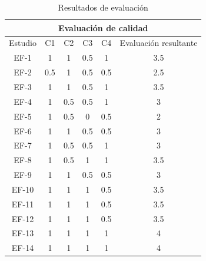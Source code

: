 \documentclass[conference,onecolumn,10pt]{IEEEtran}
\begin{document}
\begin{table}[!htbp]
        \caption{Resultados de evaluación}
        \label{tab:tablaresultados}
                \begin{center}
        \begin{tabular}{|c|c|c|c|c|c|l|}
                \hline
                \multicolumn{7}{|c|}{Evaluación de calidad}                                       \\ \hline
                Estudio  & C1   & C2   & C3   & C4   & \multicolumn{2}{c|}{Evaluación resultante} \\ \hline
                EF-1     & 1    & 1    & 0.5  & 1    & \multicolumn{2}{c|}{3.5}                   \\ \hline
                EF-2     & 0.5  & 1    & 0.5  & 0.5  & \multicolumn{2}{c|}{2.5}                   \\ \hline
                EF-3     & 1    & 1    & 0.5  & 1    & \multicolumn{2}{c|}{3.5}                   \\ \hline
                EF-4     & 1    & 0.5  & 0.5  & 1    & \multicolumn{2}{c|}{3}                     \\ \hline
                EF-5     & 1    & 0.5  & 0    & 0.5  & \multicolumn{2}{c|}{2}                     \\ \hline
                EF-6     & 1    & 1    & 0.5  & 0.5  & \multicolumn{2}{c|}{3}                     \\ \hline
                EF-7     & 1    & 0.5  & 0.5  & 1    & \multicolumn{2}{c|}{3}                     \\ \hline
                EF-8     & 1    & 0.5  & 1    & 1    & \multicolumn{2}{c|}{3.5}                   \\ \hline
                EF-9     & 1    & 1    & 0.5  & 0.5  & \multicolumn{2}{c|}{3}                     \\ \hline
                EF-10    & 1    & 1    & 1    & 0.5  & \multicolumn{2}{c|}{3.5}                   \\ \hline
                EF-11    & 1    & 1    & 1    & 0.5  & \multicolumn{2}{c|}{3.5}                   \\ \hline
                EF-12    & 1    & 1    & 1    & 0.5  & \multicolumn{2}{c|}{3.5}                   \\ \hline
                EF-13    & 1    & 1    & 1    & 1    & \multicolumn{2}{c|}{4}                     \\ \hline
                EF-14    & 1    & 1    & 1    & 1    & \multicolumn{2}{c|}{4}                     \\ \hline

\end{tabular}
\end{center}
\end{table}
\end{document}
